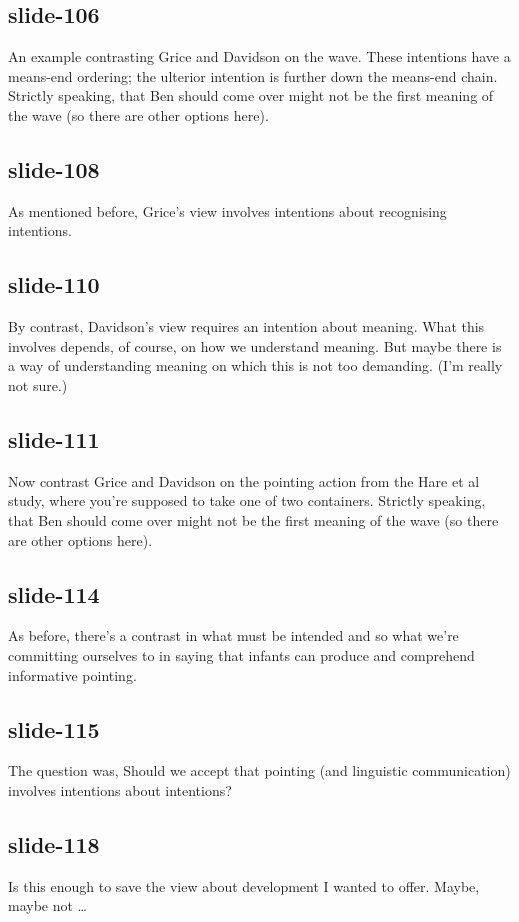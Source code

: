 \documentclass[12pt,\papersize]{extarticle}
\begin{document}
 
\subsection{slide-106}
An example contrasting Grice and Davidson on the wave.
These intentions have a means-end ordering; the ulterior intention is further down the means-end chain.
Strictly speaking, that Ben should come over might not be the first meaning of the wave (so there are other options here).
 
 
\subsection{slide-108}
As mentioned before, Grice's view involves intentions about recognising intentions.
 
 
\subsection{slide-110}
By contrast, Davidson's view requires an intention about meaning.
What this involves depends, of course, on how we understand meaning.
But maybe there is a way of understanding meaning on which this is not too demanding. (I'm really not sure.)
 
 
\subsection{slide-111}
Now contrast Grice and Davidson on the pointing action from the Hare et al study, where you're supposed to take one of two containers.
Strictly speaking, that Ben should come over might not be the first meaning of the wave (so there are other options here).
 
 
\subsection{slide-114}
As before, there's a contrast in what must be intended and so what we're committing ourselves to in saying that infants can produce and comprehend informative pointing.
 
 
\subsection{slide-115}
The question was, Should we accept that pointing (and linguistic communication) involves intentions about intentions?
 
 
\subsection{slide-118}
Is this enough to save the view about development I wanted to offer. Maybe, maybe not …
 
\end{document}
